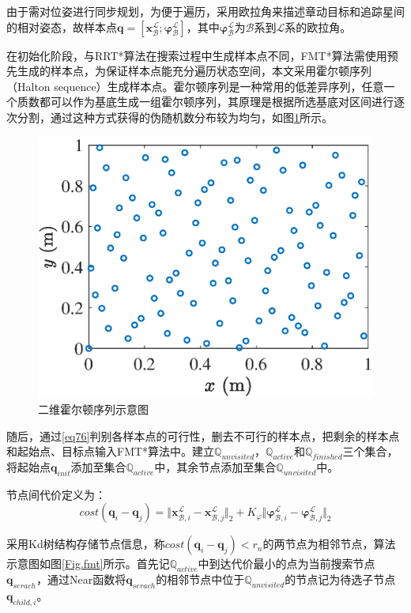 \documentclass[lang=chs, degree=master, blindreview=false, winfonts=true]{yanputhesis}
\begin{document}
由于需对位姿进行同步规划，为便于遍历，采用欧拉角来描述章动目标和追踪星间的相对姿态，故样本点$\boldsymbol{q}=[{\boldsymbol{x}}_{\mathcal{B}}^{\mathcal{L}};\boldsymbol{\varphi}_{\mathcal{B}}^{\mathcal{L}}]$，其中$\boldsymbol{\varphi}_{\mathcal{B}}^{\mathcal{L}}$为$\mathcal{B}$系到$\mathcal{L}$系的欧拉角。

在初始化阶段，与RRT*算法在搜索过程中生成样本点不同，FMT*算法需使用预先生成的样本点，为保证样本点能充分遍历状态空间，本文采用霍尔顿序列（Halton sequence）生成样本点。霍尔顿序列是一种常用的低差异序列，任意一个质数都可以作为基底生成一组霍尔顿序列，其原理是根据所选基底对区间进行逐次分割，通过这种方式获得的伪随机数分布较为均匀，如图\ref{fig-halton}所示。

\begin{figure}[htbp]
	\centering
	\includegraphics[width=2.8 in]{picture/haltonset.eps}
	\caption{二维霍尔顿序列示意图}
	\label{fig-halton}
\end{figure}

随后，通过\autoref{eq76}判别各样本点的可行性，删去不可行的样本点，把剩余的样本点和起始点、目标点输入FMT*算法中。建立$\mathbb{Q}_{unvisited}$，$\mathbb{Q}_{active}$和$\mathbb{Q}_{finished}$三个集合，将起始点$\boldsymbol{q}_{init}$添加至集合$\mathbb{Q}_{active}$中，其余节点添加至集合$\mathbb{Q}_{unvisited}$中。

节点间代价定义为：
\begin{equation}
	cost(\boldsymbol{q}_{i}-\boldsymbol{q}_{j}) =\Vert {\boldsymbol{x}}_{\mathcal{B},i}^{\mathcal{L}}-{\boldsymbol{x}}_{\mathcal{B},j}^{\mathcal{L}}\Vert_2+K_{\varphi}\Vert \boldsymbol{\varphi}_{\mathcal{B},i}^{\mathcal{L}}-\boldsymbol{\varphi}_{\mathcal{B},j}^{\mathcal{L}}\Vert_2
\end{equation}

采用Kd树结构存储节点信息，称$cost(\boldsymbol{q}_{i}-\boldsymbol{q}_{j})<r_{n}$的两节点为相邻节点，算法示意图如图\ref{Fig.fmt}所示。首先记$\mathbb{Q}_{active}$中到达代价最小的点为当前搜索节点$\boldsymbol{q}_{serach}$，通过Near函数将$\boldsymbol{q}_{serach}$的相邻节点中位于$\mathbb{Q}_{unvisited}$的节点记为待选子节点$\boldsymbol{q}_{child,i}$。
\end{document}
